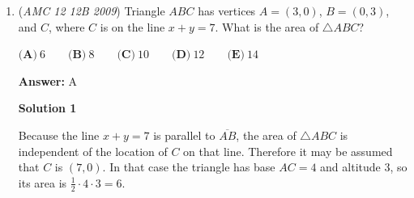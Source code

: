 \begin{enumerate}
 We must have $x+y=1$, as the desired result contains exactly one bucket. Also, we must have $\frac 23 x + \frac 12 y = 1$, as the desired result contains exactly one bucket of water.

 At this moment, it is easiest to check that only the options (A), (B), and (E) satisfy $x+y=1$, and out of these only (E) satisfies the second equation.

 Alternatively, we can directly solve the system, getting $x=3$ and $y=-2$.

 



\textbf{Solution 4}

Since $a$ is one bucket plus two-thirds of the total amount of water, and $b$ is one bucket plus one-half of the total amount of water, $a-b$ would equal $\cancel{\text{bucket}}+\frac23\cdot\text{water}-(\cancel{\text{bucket}}+\frac12\cdot\text{water})=\frac16\cdot\text{water}$. Therefore, $a-b$ is one-sixth of the total mass of the water. Starting from $a$, we add two one-sixths of the total amount of the water to become full. Therefore, the full bucket of water is $a+2(a-b)=a+2a-2b=3a-2b\Rightarrow\textbf{(E)}$

 -\href{https://artofproblemsolving.com/wiki/index.php?title=User:Sweetmango77}{SweetMango77}

 



\textbf{Solution 5 (Using answer choices+Very quick bash)}

WLOG let the bucket hold 6 units of water. Then b=4, a=3. Then test out all the answer choices to arrive at the answer choice (E)~PEKKA

 I restored the original video solution that was deleted by Whitelisted and replaced with a Rick Roll. ~IceMatrix

 


	\item (\textit{AMC 12 12B 2009}) Triangle $ABC$ has vertices $A = (3,0)$, $B = (0,3)$, and $C$, where $C$ is on the line $x + y = 7$. What is the area of $\triangle ABC$?


 $\textbf{(A)}\ 6\qquad \textbf{(B)}\ 8\qquad \textbf{(C)}\ 10\qquad \textbf{(D)}\ 12\qquad \textbf{(E)}\ 14$

 \textbf{Answer: }A



\textbf{Solution 1}

Because the line $x + y = 7$ is parallel to $\overline {AB}$, the area of $\triangle ABC$ is independent of the location of $C$ on that line.  Therefore it may be assumed that $C$ is $(7,0)$.  In that case the triangle has base $AC = 4$ and altitude $3$, so its area is $\frac 12 \cdot 4 \cdot 3 = \boxed {6}$.


\end{enumerate}
